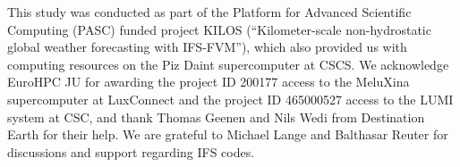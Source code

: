 \documentclass[gmd,manuscript,online]{copernicus}
\theoremstyle{theorem}
\theoremstyle{definition}
\theoremstyle{remark}
\theoremstyle{proposition}
\begin{document}



	\begin{acknowledgements}
		This study was conducted as part of the Platform for Advanced Scientific Computing (PASC) funded project KILOS (``Kilometer-scale non-hydrostatic global weather forecasting with IFS-FVM''), which also provided us with computing resources on the Piz Daint supercomputer at CSCS. We acknowledge EuroHPC JU for awarding the project ID 200177 access to the MeluXina supercomputer at LuxConnect and the project ID 465000527 access to the LUMI system at CSC, and thank Thomas Geenen and Nils Wedi from Destination Earth for their help. We are grateful to Michael Lange and Balthasar Reuter for discussions and support regarding IFS codes.
	\end{acknowledgements}

	

\end{document}
